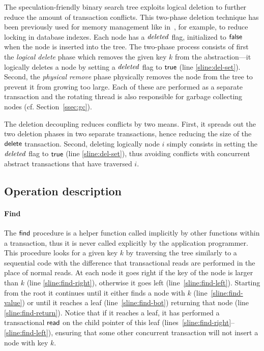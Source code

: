 The speculation-friendly binary search tree exploits logical deletion to further reduce the amount of transaction conflicts.
This two-phase deletion technique has been previously used for memory management 
like in~\cite{Moh90}, for example, to reduce locking in database indexes.
Each node has a $\ms{deleted}$ flag, initialized to $\lit{false}$ when the node is inserted into the tree.
The two-phase process consists of first the \emph{logical delete} phase which removes the given key $k$ from the abstraction---it logically deletes a node by setting a $\ms{deleted}$ flag to $\lit{true}$ (line \ref{sline:del-set}).
Second, the \emph{physical remove} phase physically removes the node from the tree to prevent it from growing too large.
Each of these are performed as a separate transaction and the rotating thread is also responsible for garbage collecting nodes (cf. Section~\ref{ssec:gc}).

The deletion decoupling reduces conflicts by two means. 
First, it spreads out the two deletion phases in two separate transactions, hence reducing the size of the $\act{delete}$ transaction.
Second, deleting logically node $i$ simply consists in setting the $\ms{deleted}$ flag to $\lit{true}$ (line \ref{sline:del-set}), thus avoiding conflicts
with concurrent abstract transactions that have traversed $i$.

\subsection{Operation description}

\paragraph{Find} 
The $\act{find}$ procedure is a helper function called implicitly by other functions within a transaction, 
thus it is never called explicitly by the application programmer.
This procedure looks for a given key $k$ by traversing the tree similarly to a sequential code with the difference that
transactional reads are performed in the place of normal reads.
At each node it goes right if the key of the node is larger than $k$ (line \ref{sline:find-right}), otherwise it goes left (line~\ref{sline:find-left}).
Starting from the root it continues until it either finds a node with $k$ (line~\ref{sline:find-value}) or until it reaches a leaf (line~\ref{sline:find-bot}) 
returning that node (line \ref{sline:find-return}).
Notice that if it reaches a leaf, it has performed a transactional $\act{read}$ on the child pointer of this leaf (lines~\ref{sline:find-right}--\ref{sline:find-left}), ensuring that 
some other concurrent transaction will not insert a node with key $k$.

